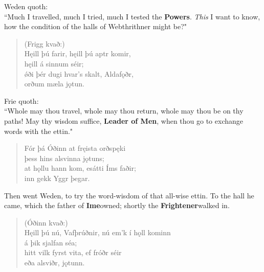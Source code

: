 \bvb Weden quoth: \\ “Much I travelled, much I tried, much I tested the \textbf{Powers}\footnotemark[4]. \emph{This} I want to know, how the condition of the halls of Webthrithner might be?" \\

\begin{verse}
(Frigg kvað:) \\%
\bva Hęill þú farir, \hld hęill þú aptr komir, \\%
\ind hęill á sinnum séir; \\%
ǿði þér dugi \hld hvar's skalt, Aldafǫðr, \\%
\ind orðum mæla jǫtun.\\%
\end{verse}

\bvb Frie quoth: \\ “Whole may thou travel, whole may thou return, whole may thou be on thy paths! May thy wisdom suffice, \textbf{Leader of Men}, when thou go to exchange words with the ettin." \\

\begin{verse}
\bva Fór þá Óðinn \hld at fręista orðspęki \\%
\ind þess hins alsvinna jǫtuns; \\%
at hǫllu hann kom, \hld es\footnotemark[1] átti Íms faðir; \\%
\ind inn gekk Yggr þegar.\\%
\end{verse}

\bvb Then went Weden, to try the word-wisdom of that all-wise ettin. To the hall he came, which the father of \textbf{Ime}\footnotemark[5] owned; shortly the \textbf{Frightener}\footnotemark[6] walked in. \\

\begin{verse}
(Óðinn kvað:) \\%
\bva Hęill þú nú, Vafþrúðnir, \hld nú em'k í hǫll kominn \\%
\ind á þik sjalfan séa; \\%
hitt vilk fyrst vita, \hld ef fróðr séir \\%
\ind eða alsviðr, jǫtunn.\\%
\end{verse}

